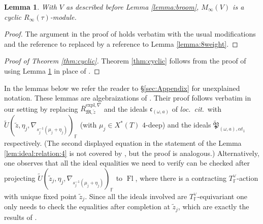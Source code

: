 \documentclass[oneside,a4paper,english, 11pt]{amsart}
\theoremstyle{plain}
\theoremstyle{plain}
\theoremstyle{plain}
\newtheorem{lemma}[thm]{Lemma}
\theoremstyle{plain}
\theoremstyle{plain}
\theoremstyle{plain}
\theoremstyle{definition}
\theoremstyle{definition}
\theoremstyle{definition}
\theoremstyle{remark}
\numberwithin{equation}{section}
\newcommand{\F}{\mathbb{F}}
\newcommand{\fM}{\mathfrak{M}}
\newcommand{\fP}{\mathfrak{P}}
\newcommand{\un}[1]{\underline{#1}}
\newcommand{\tld}[1]{\widetilde{#1}}
\newcommand{\ovl}[1]{\overline{#1}}
\DeclareMathOperator{\Fl}{Fl}
\begin{document}
\begin{lemma}\label{lemma:9weight}
With $V$ as described before Lemma \ref{lemma:broom}, $M_\infty(V)$ is a cyclic $R_\infty(\tau)$-module.
\end{lemma}
\begin{proof}
The argument in the proof of \cite[Lemma 5.1.7]{LLLM2} holds verbatim with the usual modifications and the reference to \cite[Lemma 5.1.6]{LLLM2} replaced by a reference to Lemma \ref{lemma:8weight}. 
\end{proof}

\begin{proof}[Proof of Theorem \ref{thm:cyclic}]
Theorem \ref{thm:cyclic} follows from the proof of \cite[Theorem 5.1.1]{LLLM2} using Lemma \ref{lemma:9weight} in place of \cite[Lemma 5.1.7]{LLLM2}.
\end{proof}



%
In the lemmas below we refer the reader to \S \ref{sec:Appendix} for unexplained notation.
These lemmas are algebraizations of \cite[Lemmas 3.6.12,~3.6.14,~3.6.16(3.19),~3.6.16~(3.17) and (3.18)]{LLLM2}. 
Their proof follows verbatim in our setting by replacing $\ovl{R}^{\mathrm{expl},\nabla}_{\ovl{\fM},\tld{z}}$ and the ideals $\mathfrak c_{(\omega,a)}$ of \emph{loc.~cit}.~with $\tld{U}(\tld{z}, \eta_j,\nabla_{s_j^{-1}(\mu_j+\eta_j)})_{\F}$ (with $\mu_j\in X^*(T)$ $4$-deep) and the ideals $\tld{\fP}_{(\omega,a),\alpha t_{\un{1}}}$ respectively.
(The second displayed equation in the statement of the Lemma \ref{lem:ideal:relation:4} is not covered by \cite[Lemma 3.6.16(3.17)]{LLLM2}, but the proof is analogous.)
Alternatively, one observes that all the ideal equalities we need to verify can be checked after projecting $\tld{U}(\tld{z}_j, \eta_j,\nabla_{s_j^{-1}(\mu_j+\eta_j)})_{\F}$ to $\Fl$, where there is a contracting $T^\vee_{\F}$-action with unique fixed point $\tld{z}_j$.
Since all the ideals involved are $T^\vee_{\F}$-equivariant one only needs to check the equalities after completion at $\tld{z}_j$, which are exactly the results of \cite[\S 3.6.3]{LLLM2}.
\end{document}

